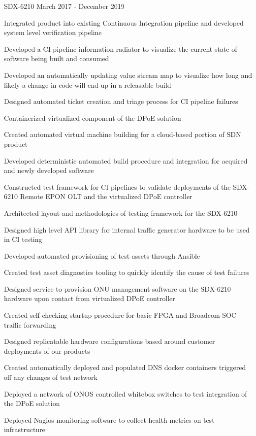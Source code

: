 \begin{cventries}
  \cventry
    {} {SDX-6210} {} {March 2017 - December 2019} {
      \begin{cvitems} %
        \item {Integrated product into existing Continuous Integration pipeline and developed system level verification pipeline}
        \item {Developed a CI pipeline information radiator to visualize the current state of software being built and consumed}
        \item {Developed an automatically updating value stream map to visualize how long and likely a change in code will end up in a releasable build}
        \item {Designed automated ticket creation and triage process for CI pipeline failures}
        \item {Containerized virtualized component of the DPoE solution}
        \item {Created automated virtual machine building for a cloud-based portion of SDN product}
        \item {Developed deterministic automated build procedure and integration for acquired and newly developed software}
        \item {Constructed test framework for CI pipelines to validate deployments of the SDX-6210 Remote EPON OLT and the virtualized DPoE controller}
        \item {Architected layout and methodologies of testing framework for the SDX-6210}
        \item {Designed high level API library for internal traffic generator hardware to be used in CI testing}
        \item {Developed automated provisioning of test assets through Ansible}
        \item {Created test asset diagnostics tooling to quickly identify the cause of test failures}
        \item {Designed service to provision ONU management software on the SDX-6210 hardware upon contact from virtualized DPoE controller}
        \item {Created self-checking startup procedure for basic FPGA and Broadcom SOC traffic forwarding}
        \item {Designed replicatable hardware configurations based around customer deployments of our products}
        \item {Created automatically deployed and populated DNS docker containers triggered off any changes of test network}
        \item {Deployed a network of ONOS controlled whitebox switches to test integration of the DPoE solution}
        \item {Deployed Nagios monitoring software to collect health metrics on test infrastructure}
      \end{cvitems}
    }


\end{cventries}
